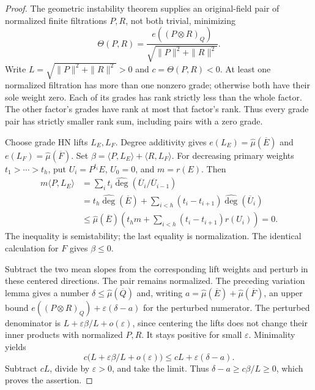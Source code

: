 \begin{proof}
The geometric instability theorem supplies an original-field pair of
normalized finite filtrations $P,R$, not both trivial, minimizing
\[
 \Theta(P,R)=\frac{e((P\otimes R)_Q)}
 {\sqrt{\|P\|^2+\|R\|^2}}.
\]
Write $L=\sqrt{\|P\|^2+\|R\|^2}>0$ and $c=\Theta(P,R)<0$.
At least one normalized filtration has more than one nonzero grade;
otherwise both have their sole weight zero. Each of its grades has
rank strictly less than the whole factor. The other factor's grades
have rank at most that factor's rank. Thus every grade pair has
strictly smaller rank sum, including pairs with a zero grade.

Choose grade HN lifts $L_E,L_F$. Degree additivity gives
$e(L_E)=\widehat\mu(\overline E)$ and
$e(L_F)=\widehat\mu(\overline F)$. Set
$\beta=\langle P,L_E\rangle+\langle R,L_F\rangle$.
For decreasing primary weights $t_1>\cdots>t_h$, put
$U_i=P^{t_i}E$, $U_0=0$, and $m=r(E)$. Then
\[
\begin{split}
 m\langle P,L_E\rangle
 &=\sum_i t_i\widehat{\deg}(\overline U_i/\overline U_{i-1})\\
 &=t_h\widehat{\deg}(\overline E)
   +\sum_{i<h}(t_i-t_{i+1})\widehat{\deg}(\overline U_i)\\
 &\le\widehat\mu(\overline E)
   \left(t_hm+\sum_{i<h}(t_i-t_{i+1})r(U_i)\right)=0.
\end{split}
\]
The inequality is semistability; the last equality is normalization.
The identical calculation for $F$ gives $\beta\le0$.

Subtract the two mean slopes from the corresponding lift weights and
perturb in these centered directions. The pair remains normalized.
The preceding variation lemma gives a number
$\delta\le\widehat\mu(\overline Q)$ and, writing
$a=\widehat\mu(\overline E)+\widehat\mu(\overline F)$, an upper bound
$e((P\otimes R)_Q)+\varepsilon(\delta-a)$ for the perturbed numerator.
The perturbed denominator is
$L+\varepsilon\beta/L+o(\varepsilon)$, since centering the lifts does
not change their inner products with normalized $P,R$.
It stays positive for small $\varepsilon$. Minimality yields
\[
 c\bigl(L+\varepsilon\beta/L+o(\varepsilon)\bigr)
 \le cL+\varepsilon(\delta-a).
\]
Subtract $cL$, divide by $\varepsilon>0$, and take the limit. Thus
$\delta-a\ge c\beta/L\ge0$, which proves the assertion.
\end{proof}

